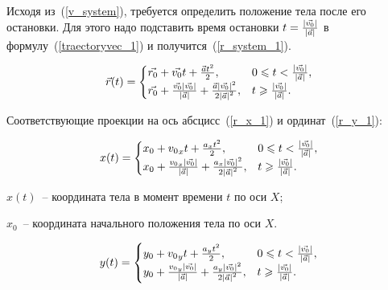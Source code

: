 Исходя из~(\ref{v_system}), требуется определить положение тела после его остановки.
Для этого надо подставить время остановки \(t = \frac{\left|\vec{v_0}\right|}{\left|\vec{a}\right|}\) в формулу~(\ref{traectoryvec_1}) и получится~(\ref{r_system_1}).

\begin{equation}\label{r_system_1}
  \vec{r}(t) = \begin{cases}
    \vec{r_0} + \vec{v_0}t + \frac{\vec{a}t^2}{2},                                                                                                 & 0 \leqslant t < \frac{\left|\vec{v_0}\right|}{\left|\vec{a}\right|}, \\
    \vec{r_0} + \frac{\vec{v_0} \left|\vec{v_0}\right|}{\left|\vec{a}\right|} + \frac{\vec{a} \left|\vec{v_0}\right|^2}{2 \left|\vec{a}\right|^2}, & t \geqslant \frac{\left|\vec{v_0}\right|}{\left|\vec{a}\right|} .
  \end{cases}
\end{equation}

Соответствующие проекции на ось абсцисс~(\ref{r_x_1}) и ординат~(\ref{r_y_1}):

\begin{equation}\label{r_x_1}
  x(t) =
  \begin{cases}
    x_0 + {v_0}_x t + \frac{a_x t^2}{2},                                                                                               & 0 \leqslant t < \frac{\left|\vec{v_0}\right|}{\left|\vec{a}\right|}, \\
    x_0 + \frac{{v_0}_x \left|\vec{v_0}\right|}{\left|\vec{a}\right|} + \frac{a_x \left|\vec{v_0}\right|^2}{2 \left|\vec{a}\right|^2}, & t \geqslant \frac{\left|\vec{v_0}\right|}{\left|\vec{a}\right|}.
  \end{cases}
\end{equation}

\begin{Underequation}
  \(x(t)\)~-- координата тела в момент времени \(t\) по оси \(X\);

  \(x_0\)~-- координата начального положения тела по оси \(X\).
\end{Underequation}

\begin{equation}\label{r_y_1}
  y(t) =
  \begin{cases}
    y_0 + {v_0}_y t + \frac{a_y t^2}{2},                                                                                               & 0 \leqslant t < \frac{\left|\vec{v_0}\right|}{\left|\vec{a}\right|}, \\
    y_0 + \frac{{v_0}_y \left|\vec{v_0}\right|}{\left|\vec{a}\right|} + \frac{a_y \left|\vec{v_0}\right|^2}{2 \left|\vec{a}\right|^2}, & t \geqslant \frac{\left|\vec{v_0}\right|}{\left|\vec{a}\right|}.
  \end{cases}
\end{equation}

